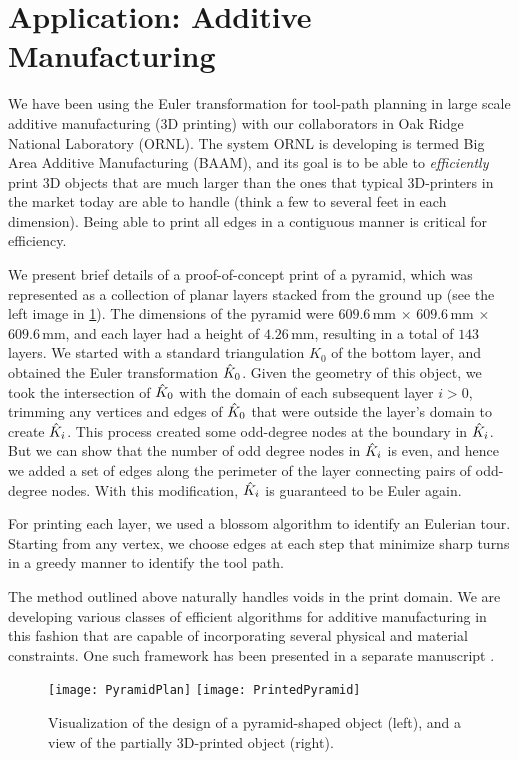 \section{Application: Additive Manufacturing} \label{sec:3dprtg}

We have been using the Euler transformation for tool-path planning in large scale additive manufacturing (3D printing) with our collaborators in Oak Ridge National Laboratory (ORNL).
The system ORNL is developing is termed Big Area Additive Manufacturing (BAAM), and its goal is to be able to \emph{efficiently} print 3D objects that are much larger than the ones that typical 3D-printers in the market today are able to handle (think a few to several feet in each dimension).
Being able to print all edges in a contiguous manner is critical for efficiency.

We present brief details of a proof-of-concept print of a pyramid, which was represented as a collection of planar layers stacked from the ground up (see the left image in \cref{fig:3dprtg}).
The dimensions of the pyramid were $609.6\,$mm $\times$ $609.6\,$mm $\times$ $609.6\,$mm, and each layer had a height of $4.26\,$mm, resulting in a total of $143$ layers.
We started with a standard triangulation $K_0$ of the bottom layer, and obtained the Euler transformation $\hat{K}_0$.
Given the geometry of this object, we took the intersection of $\hat{K}_0$ with the domain of each subsequent layer $i>0$, trimming any vertices and edges of $\hat{K}_0$ that were outside the layer's domain to create $\hat{K}_i$.
This process created some odd-degree nodes at the boundary in $\hat{K}_i$.
But we can show that the number of odd degree nodes in $\hat{K}_i$ is even, and hence we added a set of edges along the perimeter of the layer connecting pairs of odd-degree nodes.
With this modification, $\hat{K}_i$ is guaranteed to be Euler again.

For printing each layer, we used a blossom algorithm to identify an Eulerian tour.
Starting from any vertex, we choose edges at each step that minimize sharp turns in a greedy manner to identify the tool path.

The method outlined above naturally handles voids in the print domain.
We are developing various classes of efficient algorithms for additive manufacturing in this fashion that are capable of incorporating several physical and material constraints.
One such framework has been presented in a separate manuscript \cite{GuKrDr2020}.


\begin{figure}[htp!]
  \centering
  \texttt{[image: PyramidPlan]}
  \quad
  \texttt{[image: PrintedPyramid]}
  \caption{Visualization of the design of a pyramid-shaped object (left), and a view of the partially 3D-printed object (right). }
  \label{fig:3dprtg}
\end{figure}


